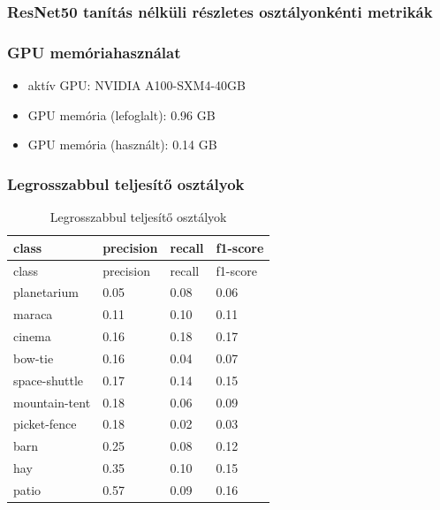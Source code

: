 \subsubsection{ResNet50 tanítás nélküli részletes osztályonkénti metrikák}
  

\subsubsection{GPU memóriahasználat}
\begin{itemize}
  \item aktív GPU: NVIDIA A100-SXM4-40GB
  \item GPU memória (lefoglalt): 0.96 GB
  \item GPU memória (használt):  0.14 GB
\end{itemize}

\subsubsection{Legrosszabbul teljesítő osztályok}
  \begin{center}
    \begin{longtable}{llll}
    \caption{Legrosszabbul teljesítő osztályok}\label{tab:phase01_resnet50_legrosszabb_osztlyok}\\
    \toprule
    class & precision & recall & f1-score \\
    \midrule
    \endfirsthead
    \toprule
    class & precision & recall & f1-score \\
    \midrule
    \endhead
    planetarium & 0.05 & 0.08 & 0.06 \\
    maraca & 0.11 & 0.10 & 0.11 \\
    cinema & 0.16 & 0.18 & 0.17 \\
    bow-tie & 0.16 & 0.04 & 0.07 \\
    space-shuttle & 0.17 & 0.14 & 0.15 \\
    mountain-tent & 0.18 & 0.06 & 0.09 \\
    picket-fence & 0.18 & 0.02 & 0.03 \\
    barn & 0.25 & 0.08 & 0.12 \\
    hay & 0.35 & 0.10 & 0.15 \\
    patio & 0.57 & 0.09 & 0.16 \\
    \bottomrule
    \end{longtable}
    \end{center}